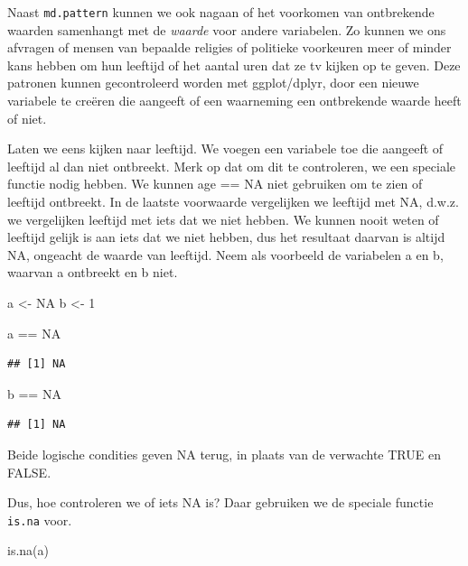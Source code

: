\documentclass[]{tufte-book}
\newenvironment{Shaded}{}{}
\newcommand{\ConstantTok}[1]{\textcolor[rgb]{0.53,0.00,0.00}{#1}}
\newcommand{\DecValTok}[1]{\textcolor[rgb]{0.25,0.63,0.44}{#1}}
\newcommand{\FunctionTok}[1]{\textcolor[rgb]{0.02,0.16,0.49}{#1}}
\newcommand{\NormalTok}[1]{#1}
\newcommand{\OtherTok}[1]{\textcolor[rgb]{0.00,0.44,0.13}{#1}}
\newcommand{\SpecialCharTok}[1]{\textcolor[rgb]{0.25,0.44,0.63}{#1}}
\begin{document}
Naast \texttt{md.pattern} kunnen we ook nagaan of het voorkomen van ontbrekende waarden samenhangt met de \emph{waarde} voor andere variabelen. Zo kunnen we ons afvragen of mensen van bepaalde religies of politieke voorkeuren meer of minder kans hebben om hun leeftijd of het aantal uren dat ze tv kijken op te geven. Deze patronen kunnen gecontroleerd worden met ggplot/dplyr, door een nieuwe variabele te creëren die aangeeft of een waarneming een ontbrekende waarde heeft of niet.

Laten we eens kijken naar leeftijd. We voegen een variabele toe die aangeeft of leeftijd al dan niet ontbreekt. Merk op dat om dit te controleren, we een speciale functie nodig hebben. We kunnen age == NA niet gebruiken om te zien of leeftijd ontbreekt. In de laatste voorwaarde vergelijken we leeftijd met NA, d.w.z. we vergelijken leeftijd met iets dat we niet hebben. We kunnen nooit weten of leeftijd gelijk is aan iets dat we niet hebben, dus het resultaat daarvan is altijd NA, ongeacht de waarde van leeftijd. Neem als voorbeeld de variabelen a en b, waarvan a ontbreekt en b niet.

\begin{Shaded}
\begin{Highlighting}[]
\NormalTok{a }\OtherTok{\textless{}{-}} \ConstantTok{NA}
\NormalTok{b }\OtherTok{\textless{}{-}} \DecValTok{1}

\NormalTok{a }\SpecialCharTok{==} \ConstantTok{NA}
\end{Highlighting}
\end{Shaded}

\begin{verbatim}
## [1] NA
\end{verbatim}

\begin{Shaded}
\begin{Highlighting}[]
\NormalTok{b }\SpecialCharTok{==} \ConstantTok{NA}
\end{Highlighting}
\end{Shaded}

\begin{verbatim}
## [1] NA
\end{verbatim}

Beide logische condities geven NA terug, in plaats van de verwachte TRUE en FALSE.

Dus, hoe controleren we of iets NA is? Daar gebruiken we de speciale functie \texttt{is.na} voor.

\begin{Shaded}
\begin{Highlighting}[]
\FunctionTok{is.na}\NormalTok{(a)}
\end{Highlighting}
\end{Shaded}
\end{document}
